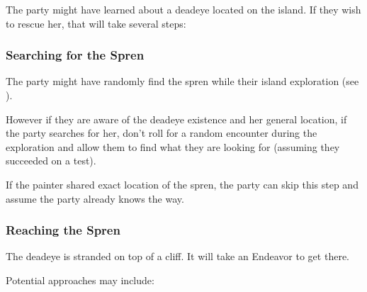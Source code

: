 The party might have learned about a deadeye located on the island. If they wish to rescue her, that will take several steps:

\subsubsection{Searching for the Spren}

The party might have randomly find the spren while their island exploration (see ). 

However if they are aware of the deadeye existence and her general location, if the party searches for her, don't roll for a random encounter during the exploration and allow them to find what they are looking for (assuming they succeeded on a \skillSurvival{} test).

If the painter shared exact location of the spren, the party can skip this step and assume the party already knows the way.

\subsubsection{Reaching the Spren}

The deadeye is stranded on top of a cliff. It will take an Endeavor to get there. 

Potential approaches may include:






